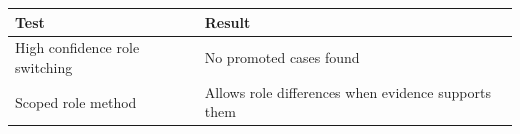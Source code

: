 \begin{tabular}{ll}
\toprule
Test & Result \\
\midrule
High confidence role switching & No promoted cases found \\
Scoped role method & Allows role differences when evidence supports them \\
\bottomrule
\end{tabular}